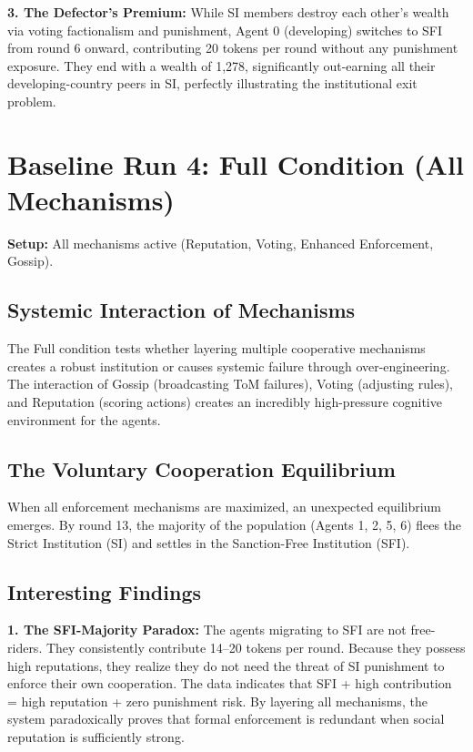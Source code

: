 \documentclass[11pt,a4paper]{article}
\begin{document}
\textbf{3. The Defector's Premium:}
While SI members destroy each other's wealth via voting factionalism and punishment, Agent 0 (developing) switches to SFI from round 6 onward, contributing 20 tokens per round without any punishment exposure. They end with a wealth of 1,278, significantly out-earning all their developing-country peers in SI, perfectly illustrating the institutional exit problem.

\section{Baseline Run 4: Full Condition (All Mechanisms)}
\textbf{Setup:} All mechanisms active (Reputation, Voting, Enhanced Enforcement, Gossip).

\subsection{Systemic Interaction of Mechanisms}
The Full condition tests whether layering multiple cooperative mechanisms creates a robust institution or causes systemic failure through over-engineering. The interaction of Gossip (broadcasting ToM failures), Voting (adjusting rules), and Reputation (scoring actions) creates an incredibly high-pressure cognitive environment for the agents.

\subsection{The Voluntary Cooperation Equilibrium}
When all enforcement mechanisms are maximized, an unexpected equilibrium emerges. By round 13, the majority of the population (Agents 1, 2, 5, 6) flees the Strict Institution (SI) and settles in the Sanction-Free Institution (SFI). 

\subsection{Interesting Findings}
\textbf{1. The SFI-Majority Paradox:}
The agents migrating to SFI are not free-riders. They consistently contribute 14--20 tokens per round. Because they possess high reputations, they realize they do not need the threat of SI punishment to enforce their own cooperation. The data indicates that SFI + high contribution = high reputation + zero punishment risk. By layering all mechanisms, the system paradoxically proves that formal enforcement is redundant when social reputation is sufficiently strong.
\end{document}
